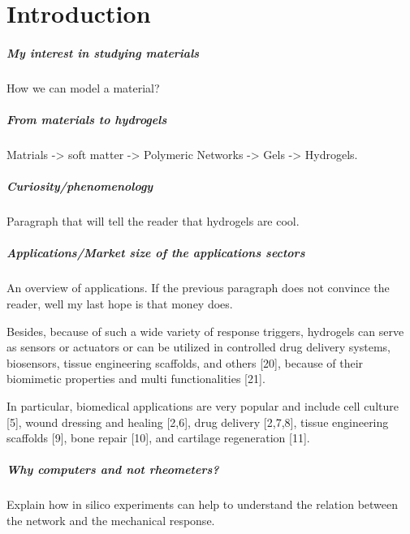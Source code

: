 \chapter{Introduction}\label{ch1:Intro}



\paragraph{My interest in studying materials} How we can model a material? 

\paragraph{From materials to hydrogels} Matrials -> soft matter -> Polymeric Networks -> Gels -> Hydrogels.

\paragraph{Curiosity/phenomenology} Paragraph that will tell the reader that hydrogels are cool.

\paragraph{Applications/Market size of the applications sectors} An overview of applications. If the previous paragraph does not convince the reader, well my last hope is that money does.

Besides, because of such a wide variety of response triggers, hydrogels can serve as sensors or actuators or can be utilized in controlled drug delivery systems, biosensors, tissue engineering scaffolds, and others [20], because of their biomimetic properties and multi functionalities [21]\citep{bustamantetorresHydrogelsClassificationAccording2021}.

In particular, biomedical applications are very popular and include cell culture [5], wound dressing and healing [2,6], drug delivery [2,7,8], tissue engineering scaffolds [9], bone repair [10], and cartilage regeneration [11]\citep{picchioniHydrogelsBasedDynamic2018}. 

\paragraph{Why computers and not rheometers?} Explain how in silico experiments can help to understand the relation between the network and the mechanical response.


